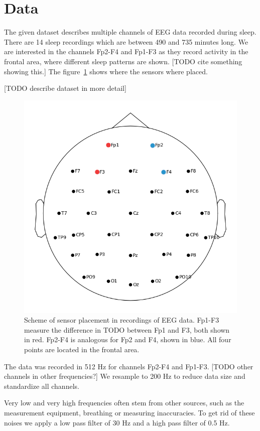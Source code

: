 \section{Data}
\label{sec:data}

The given dataset describes multiple channels of EEG data recorded during sleep. There are 14 sleep recordings which are between 490 and 735 minutes long. We are interested in the channels Fp2-F4 and Fp1-F3 as they record activity in the frontal area, where different sleep patterns are shown. [TODO cite something showing this.] The figure~\ref{fig:head_placement} shows where the sensors where placed.

[TODO describe dataset in more detail]

\begin{figure}
	\centering
	\includegraphics[width=0.7\linewidth]{figs/head_placement}
	\caption{Scheme of sensor placement in recordings of EEG data. Fp1-F3 measure the difference in TODO between Fp1 and F3, both shown in red. Fp2-F4 is analogous for Fp2 and F4, shown in blue. All four points are located in the frontal area.}
	\label{fig:head_placement}
\end{figure}


The data was recorded in 512 Hz for channels Fp2-F4 and Fp1-F3. [TODO other channels in other frequencies?] We resample to 200 Hz to reduce data size and standardize all channels.

Very low and very high frequencies often stem from other sources, such as the measurement equipment, breathing or measuring inaccuracies. To get rid of these noises we apply a low pass filter of 30 Hz and a high pass filter of 0.5 Hz.


